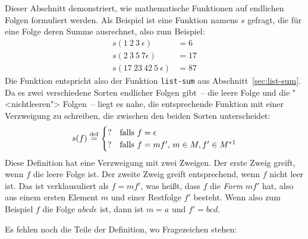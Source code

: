 Dieser Abschnitt demonstriert, wie mathematische Funktionen auf endlichen Folgen
formuliert werden.
Als Beispiel ist eine Funktion namens $s$ gefragt, die für eine Folge deren Summe
ausrechnet, also zum Beispiel:
%
\begin{displaymath}
  \begin{split}
  s(1~2~3~\epsilon) &= 6 \\
  s(2~3~5~7\epsilon) &= 17\\
  s(17~23~42~5~\epsilon) &= 87
\end{split}
\end{displaymath}
% 
Die Funktion entspricht also der Funktion \texttt{list-sum} aus
Abschnitt~\ref{sec:list-sum}.  Da es zwei verschiedene Sorten endlicher Folgen gibt~-- die leere
Folge und die "<nichtleeren"> Folgen~-- liegt es
nahe, die entsprechende Funktion mit einer Verzweigung zu schreiben,
die zwischen den beiden Sorten unterscheidet:
%
\begin{displaymath}
  s(f) \deq
  \begin{cases}
    ? & \textrm{falls $f = \epsilon$}\\
    ? & \textrm{falls $f = mf'$, $m\in M, f'\in
        M^\ast$}\footnotemark
  \end{cases}
\end{displaymath}
%
Diese Definition hat eine Verzweigung mit zwei Zweigen.  Der erste
Zweig greift, wenn $f$ die leere Folge ist.  Der zweite Zweig greift
entsprechend, wenn $f$ nicht leer ist.  Das ist verklausuliert
als $f =mf'$, was heißt, dass $f$ die \emph{Form} $mf'$ hat, also
aus einem ersten Element $m$ und einer Restfolge $f'$ besteht.  Wenn
also zum Beispiel $f$ die Folge $abcd\epsilon$ ist, dann ist $m = a$
und $f' =bcd$.

Es fehlen noch die Teile der Definition, wo Fragezeichen stehen:

